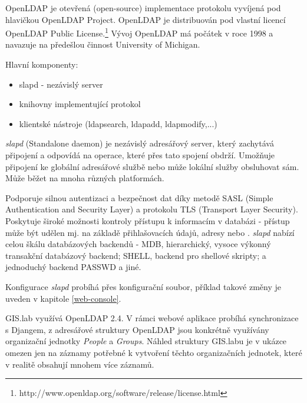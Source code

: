 OpenLDAP je otevřená (open-source) implementace protokolu 
vyvíjená pod hlavičkou OpenLDAP Project. OpenLDAP je distribuován pod
vlastní licencí OpenLDAP Public
License.\footnote{http://www.openldap.org/software/release/license.html}
Vývoj OpenLDAP má počátek v roce 1998 a navazuje na předešlou činnost
University of Michigan.

Hlavní komponenty:
\begin{itemize}
\item slapd - nezávislý  server
\item knihovny implementující  protokol
\item klientské nástroje (ldapsearch, ldapadd, ldapmodify,...)
\end{itemize}

\textit{slapd} (Standalone  daemon) je nezávislý 
adresářový server, který zachytává připojení a odpovídá na
operace, které přes tato spojení obdrží. Umožňuje připojení ke
globální  adresářové službě nebo může lokální služby
obsluhovat sám. Může běžet na mnoha různých platformách.

Podporuje silnou autentizaci a bezpečnost dat díky metodě SASL (Simple
Authentication and Security Layer) a protokolu TLS (Transport Layer
Security). Poskytuje široké možnosti kontroly přístupu k informacím v
databázi - přístup může být udělen mj. na základě přihlašovacích
údajů,  adresy nebo . \textit{slapd} nabízí celou škálu
databázových backendů - MDB, hierarchický, vysoce výkonný transakční
databázový backend; SHELL, backend pro shellové skripty; a jednoduchý
backend PASSWD a jiné.

Konfigurace \textit{slapd} probíhá přes konfigurační soubor, příklad takové změny je uveden v kapitole \ref{web-console}. 


GIS.lab využívá OpenLDAP 2.4. V rámci webové aplikace probíhá
synchronizace s Djangem, z adresářové struktury OpenLDAP jsou
konkrétně využívány organizační jednotky \textit{People} a
\textit{Groups}. Náhled struktury GIS.labu je v ukázce omezen jen na
záznamy potřebné k vytvoření  těchto organizačních jednotek,
které v realitě obsahují mnohem více záznamů.


